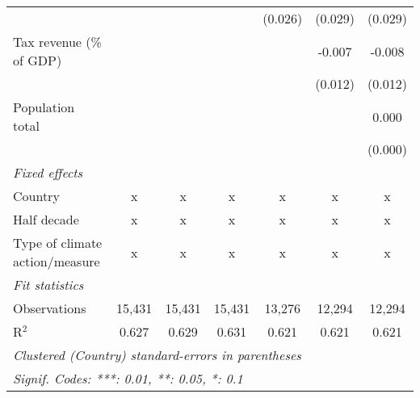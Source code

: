 \begin{tabular}{lcccccc}
                                                            &         &              &               & (0.026)       & (0.029)       & (0.029)\\   
   Tax revenue (\% of GDP)                                  &         &              &               &               & -0.007        & -0.008\\   
                                                            &         &              &               &               & (0.012)       & (0.012)\\   
   Population total                                         &         &              &               &               &               & 0.000\\   
                                                            &         &              &               &               &               & (0.000)\\   
   \emph{Fixed effects}\\
   Country                                                  & x       & x            & x             & x             & x             & x\\  
   Half decade                                              & x       & x            & x             & x             & x             & x\\  
   Type of climate action/measure                           & x       & x            & x             & x             & x             & x\\  
   \midrule \emph{Fit statistics}\\
   Observations                                             & 15,431  & 15,431       & 15,431        & 13,276        & 12,294        & 12,294\\  
   R$^2$                                                    & 0.627   & 0.629        & 0.631         & 0.621         & 0.621         & 0.621\\  
   \midrule
   \multicolumn{7}{l}{\emph{Clustered (Country) standard-errors in parentheses}}\\
   \multicolumn{7}{l}{\emph{Signif. Codes: ***: 0.01, **: 0.05, *: 0.1}}\\
\end{tabular}
\par\endgroup


